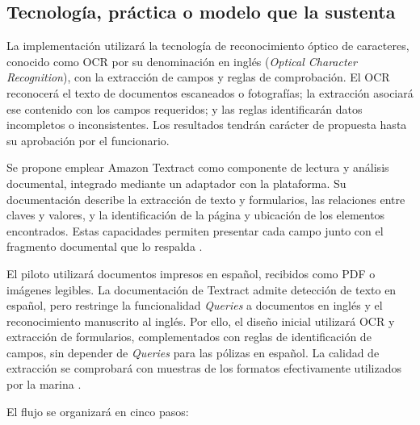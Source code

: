 \subsection{Tecnología, práctica o modelo que la sustenta}

La implementación utilizará la tecnología de reconocimiento óptico de caracteres, conocido como OCR por su denominación en inglés (\textit{Optical Character Recognition}), con la extracción de campos y reglas de comprobación. El OCR reconocerá el texto de documentos escaneados o fotografías; la extracción asociará ese contenido con los campos requeridos; y las reglas identificarán datos incompletos o inconsistentes. Los resultados tendrán carácter de propuesta hasta su aprobación por el funcionario.

Se propone emplear Amazon Textract como componente de lectura y análisis documental, integrado mediante un adaptador con la plataforma. Su documentación describe la extracción de texto y formularios, las relaciones entre claves y valores, y la identificación de la página y ubicación de los elementos encontrados. Estas capacidades permiten presentar cada campo junto con el fragmento documental que lo respalda \parencite{in3-aws-analisis}.

El piloto utilizará documentos impresos en español, recibidos como PDF o imágenes legibles. La documentación de Textract admite detección de texto en español, pero restringe la funcionalidad \textit{Queries} a documentos en inglés y el reconocimiento manuscrito al inglés. Por ello, el diseño inicial utilizará OCR y extracción de formularios, complementados con reglas de identificación de campos, sin depender de \textit{Queries} para las pólizas en español. La calidad de extracción se comprobará con muestras de los formatos efectivamente utilizados por la marina \parencite{in3-aws-limites}.

El flujo se organizará en cinco pasos:

